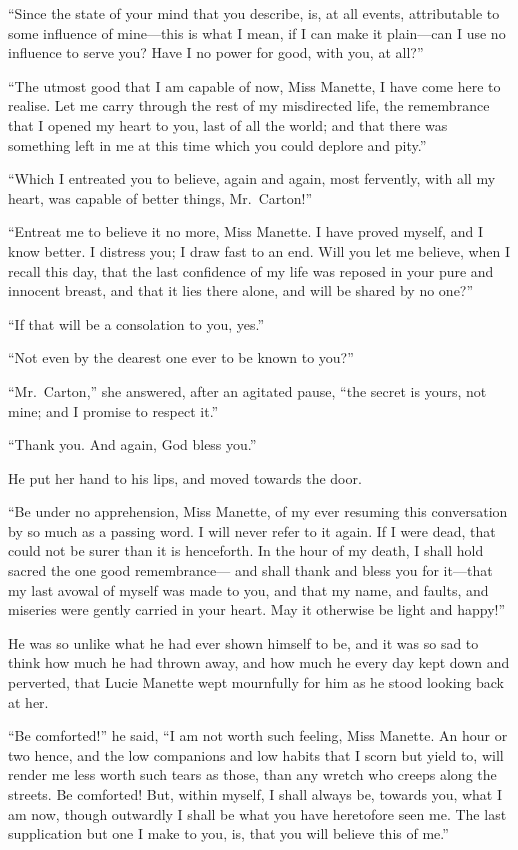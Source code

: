 ``Since the state of your mind that you describe, is, at all events,
attributable to some influence of mine---this is what I mean,
if I can make it plain---can I use no influence to serve you?
Have I no power for good, with you, at all?''

``The utmost good that I am capable of now, Miss Manette, I have come
here to realise.  Let me carry through the rest of my misdirected life,
the remembrance that I opened my heart to you, last of all the world;
and that there was something left in me at this time which you could
deplore and pity.''

``Which I entreated you to believe, again and again, most fervently,
with all my heart, was capable of better things, Mr.\ Carton!''

``Entreat me to believe it no more, Miss Manette.  I have proved myself,
and I know better.  I distress you; I draw fast to an end.  Will you let
me believe, when I recall this day, that the last confidence of my life
was reposed in your pure and innocent breast, and that it lies there
alone, and will be shared by no one?''

``If that will be a consolation to you, yes.''

``Not even by the dearest one ever to be known to you?''

``Mr.\ Carton,'' she answered, after an agitated pause, ``the secret is
yours, not mine; and I promise to respect it.''

``Thank you.  And again, God bless you.''

He put her hand to his lips, and moved towards the door.

``Be under no apprehension, Miss Manette, of my ever resuming this
conversation by so much as a passing word.  I will never refer to it
again.  If I were dead, that could not be surer than it is henceforth.
In the hour of my death, I shall hold sacred the one good remembrance---%
and shall thank and bless you for it---that my last avowal of myself was
made to you, and that my name, and faults, and miseries were gently
carried in your heart.  May it otherwise be light and happy!''

He was so unlike what he had ever shown himself to be, and it was
so sad to think how much he had thrown away, and how much he every
day kept down and perverted, that Lucie Manette wept mournfully for
him as he stood looking back at her.

``Be comforted!'' he said, ``I am not worth such feeling, Miss Manette.
An hour or two hence, and the low companions and low habits that I scorn
but yield to, will render me less worth such tears as those, than any
wretch who creeps along the streets.  Be comforted!  But, within myself,
I shall always be, towards you, what I am now, though outwardly I shall
be what you have heretofore seen me.  The last supplication but one
I make to you, is, that you will believe this of me.''


